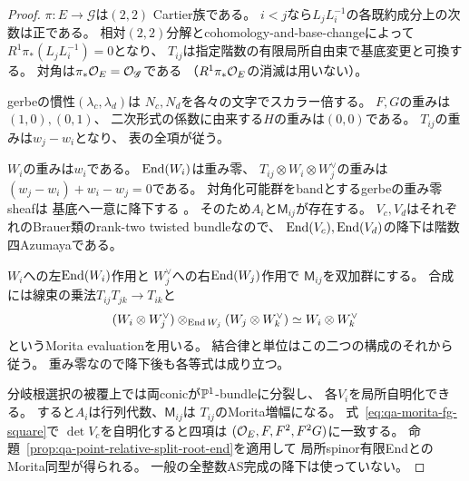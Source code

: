 \begin{proof}
$\pi:E\to\mathscr G$は$(2,2)$ Cartier族である。
$i<j$なら$L_jL_i^{-1}$の各既約成分上の次数は正である。
相対$(2,2)$分解とcohomology-and-base-changeによって
$R^1\pi_*(L_jL_i^{-1})=0$となり、
$T_{ij}$は指定階数の有限局所自由束で基底変更と可換する。
対角は$\pi_*\mathcal O_E=\mathcal O_{\mathscr G}$である
（$R^1\pi_*\mathcal O_E$の消滅は用いない）。

gerbeの慣性$(\lambda_c,\lambda_d)$は
$N_c,N_d$を各々の文字でスカラー倍する。
$F,G$の重みは$(1,0),(0,1)$、
二次形式の係数に由来する$H$の重みは$(0,0)$である。
$T_{ij}$の重みは$w_j-w_i$となり、
表の全項が従う。

$W_i$の重みは$w_i$である。
$\operatorname{End}(W_i)$は重み零、
$T_{ij}\otimes W_i\otimes W_j^\vee$の重みは
$(w_j-w_i)+w_i-w_j=0$である。
対角化可能群をbandとするgerbeの重み零sheafは
基底へ一意に降下する
\cite[Theorem~4.7]{BerghSchnurer2021}。
そのため$A_i$と$\mathsf M_{ij}$が存在する。
$V_c,V_d$はそれぞれのBrauer類のrank-two twisted bundleなので、
$\operatorname{End}(V_c),\operatorname{End}(V_d)$の降下は階数四Azumayaである。

$W_i$への左$\operatorname{End}(W_i)$作用と
$W_j^\vee$への右$\operatorname{End}(W_j)$作用で
$\mathsf M_{ij}$を双加群にする。
合成には線束の乗法$T_{ij}T_{jk}\to T_{ik}$と
\[
 (W_i\otimes W_j^\vee)
 \otimes_{\operatorname{End} W_j}(W_j\otimes W_k^\vee)
 \simeq W_i\otimes W_k^\vee
\]
というMorita evaluationを用いる。
結合律と単位はこの二つの構成のそれから従う。
重み零なので降下後も各等式は成り立つ。

分岐根選択の被覆上では両conicが$\mathbb P^1$-bundleに分裂し、
各$V_i$を局所自明化できる。
すると$A_i$は行列代数、$\mathsf M_{ij}$は
$T_{ij}$のMorita増幅になる。
式~\eqref{eq:qa-morita-fg-square}で
$\det V_c$を自明化すると四項は
$(\mathcal O_E,F,F^2,F^2G)$に一致する。
命題~\ref{prop:qa-point-relative-split-root-end}を適用して
局所spinor有限EndとのMorita同型が得られる。
一般の全整数AS完成の降下は使っていない。
\end{proof}


